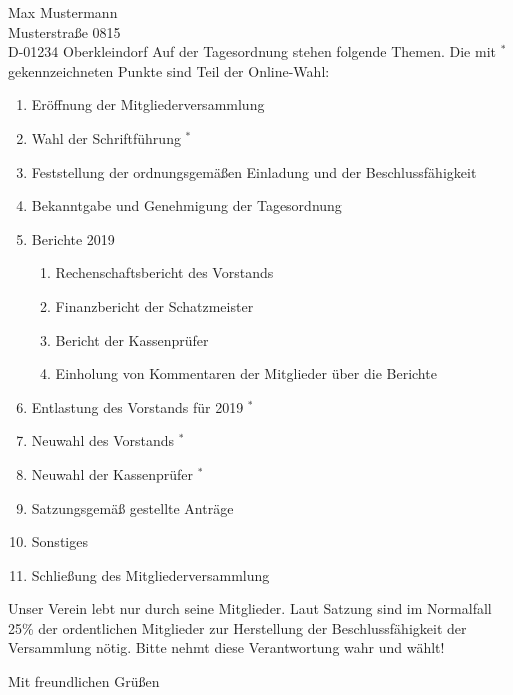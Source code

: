 \documentclass[../Vorlagen/de-RSE_Brief,a4paper]{scrlttr2}
\begin{document}
\begin{letter}{
    Max Mustermann\\
    Musterstraße 0815\\
    D-01234 Oberkleindorf
}
\clearpage
\vspace{2em}
Auf der Tagesordnung stehen folgende Themen. Die mit ${}^*$ gekennzeichneten Punkte sind Teil der Online-Wahl:
\begin{enumerate}
\setlength\itemsep{0em}
\item Eröffnung der Mitgliederversammlung
\item Wahl der Schriftführung ${}^*$
\item Feststellung der ordnungsgemäßen Einladung und der Beschlussfähigkeit
\item Bekanntgabe und Genehmigung der Tagesordnung
\item Berichte 2019
\begin{enumerate}
 \item Rechenschaftsbericht des Vorstands
 \item Finanzbericht der Schatzmeister
 \item Bericht der Kassenprüfer
 \item Einholung von Kommentaren der Mitglieder über die Berichte
\end{enumerate}
\item Entlastung des Vorstands für 2019 ${}^*$
\item Neuwahl des Vorstands ${}^*$
\item Neuwahl der Kassenprüfer ${}^*$
\item Satzungsgemäß gestellte Anträge
\item Sonstiges
\item Schließung des Mitgliederversammlung
\end{enumerate}

Unser Verein lebt nur durch seine Mitglieder.
Laut Satzung sind im Normalfall 25\% der ordentlichen Mitglieder zur Herstellung der Beschlussfähigkeit der Versammlung nötig.
Bitte nehmt diese Verantwortung wahr und wählt!

\closing{Mit freundlichen Grüßen}
\end{letter}
\end{document}

